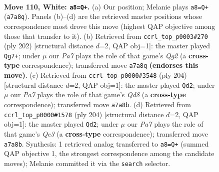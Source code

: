 \documentclass[11pt]{article}
\begin{document}
\begin{figure}[p]\centering
\begin{subfigure}{0.46\textwidth}\centering
\resizebox{\linewidth}{!}{%
\newchessgame
\chessboard[
  setfen={5k2/P7/6K1/8/8/8/8/8 w - - 1 110},
  showmover=false,
  pgfstyle=straightmove, color=movearrow, markmove={a7-a8}
]}
\caption{}
\end{subfigure}\hfill
\begin{subfigure}{0.46\textwidth}\centering
\resizebox{\linewidth}{!}{%
\newchessgame
\chessboard[
  setfen={8/2k5/8/2K5/8/8/6Q1/8 w - - 5 102},
  showmover=false,
  pgfstyle=straightmove, color=movearrow, markmove={g2-g7}
]}
\caption{}
\end{subfigure}
\\[4pt]
\begin{subfigure}{0.46\textwidth}\centering
\resizebox{\linewidth}{!}{%
\newchessgame
\chessboard[
  setfen={3Q4/8/8/8/2K5/k7/8/8 w - - 6 103},
  showmover=false,
  pgfstyle=straightmove, color=movearrow, markmove={d8-d2}
]}
\caption{}
\end{subfigure}\hfill
\begin{subfigure}{0.46\textwidth}\centering
\resizebox{\linewidth}{!}{%
\newchessgame
\chessboard[
  setfen={8/8/8/8/8/4Q3/8/1k1K4 w - - 8 103},
  showmover=false,
  pgfstyle=straightmove, color=movearrow, markmove={e3-d2}
]}
\caption{}
\end{subfigure}
\caption{\textbf{Move 110, White: \texttt{a8=Q+}.} (a) Our position; Melanie plays \texttt{a8=Q+} (\texttt{a7a8q}). Panels (b)--(d) are the retrieved master positions whose correspondence most drove this move (highest QAP objective among those that transfer to it). (b) Retrieved from \texttt{ccrl\_top\_p0003\#270} (ply 202) [structural distance $d$=2, QAP obj=1]: the master played \texttt{Qg7+}; under $\mu$ our \emph{Pa7} plays the role of that game's \emph{Qg2} (a \textbf{cross-type} correspondence); transferred move \texttt{a7a8q} \textbf{(endorses this move)}. (c) Retrieved from \texttt{ccrl\_top\_p0000\#3548} (ply 204) [structural distance $d$=2, QAP obj=1]: the master played \texttt{Qd2}; under $\mu$ our \emph{Pa7} plays the role of that game's \emph{Qd8} (a \textbf{cross-type} correspondence); transferred move \texttt{a7a8b}. (d) Retrieved from \texttt{ccrl\_top\_p0000\#1578} (ply 204) [structural distance $d$=2, QAP obj=1]: the master played \texttt{Qd2}; under $\mu$ our \emph{Pa7} plays the role of that game's \emph{Qe3} (a \textbf{cross-type} correspondence); transferred move \texttt{a7a8b}. Synthesis: 1 retrieved analog transferred to \texttt{a8=Q+} (summed QAP objective 1, the strongest correspondence among the candidate moves); Melanie committed it via the \texttt{search} selector.}
\label{fig:thought-m218}
\end{figure}
\end{document}
